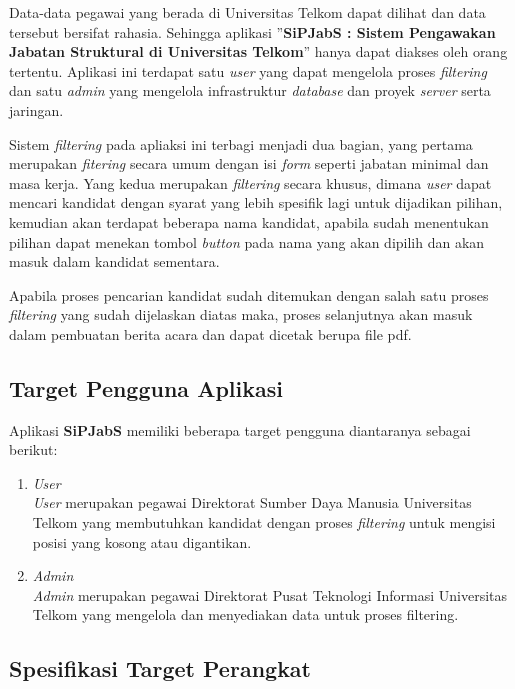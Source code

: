 Data-data pegawai yang berada di Universitas Telkom dapat dilihat dan data tersebut bersifat rahasia. Sehingga aplikasi ”\textbf{SiPJabS : Sistem Pengawakan Jabatan Struktural di Universitas Telkom}” hanya dapat diakses oleh orang tertentu. Aplikasi ini terdapat satu \textit{user} yang dapat mengelola proses \textit{filtering} dan satu \textit{admin} yang mengelola infrastruktur \textit{database} dan proyek \textit{server} serta jaringan.  

Sistem \textit{filtering} pada apliaksi ini terbagi menjadi dua bagian, yang pertama merupakan \textit{fitering} secara umum dengan isi \textit{form} seperti jabatan minimal dan masa kerja. Yang kedua merupakan \textit{filtering} secara khusus, dimana \textit{user} dapat mencari kandidat dengan syarat yang lebih spesifik lagi untuk dijadikan pilihan, kemudian akan terdapat beberapa nama kandidat, apabila sudah menentukan pilihan dapat menekan tombol \textit{button} pada nama yang akan dipilih dan akan masuk dalam kandidat sementara.

Apabila proses pencarian kandidat sudah ditemukan dengan salah satu proses \textit{filtering} yang sudah dijelaskan diatas maka, proses selanjutnya akan masuk dalam pembuatan berita acara dan dapat dicetak berupa file pdf.  

\subsection{Target Pengguna Aplikasi}

Aplikasi \textbf{SiPJabS} memiliki beberapa target pengguna diantaranya sebagai berikut:

\begin{enumerate}
\item \textit{User} \\
\textit{User} merupakan pegawai Direktorat Sumber Daya Manusia Universitas Telkom yang membutuhkan kandidat dengan proses \textit{filtering} untuk mengisi posisi yang kosong atau digantikan.

\item \textit{Admin} \\
\textit{Admin} merupakan pegawai Direktorat Pusat Teknologi Informasi Universitas Telkom yang mengelola dan menyediakan data untuk proses filtering.
\end{enumerate}

\subsection{Spesifikasi Target Perangkat}

